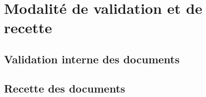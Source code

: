 \section{Modalité de validation et de recette}

\subsection{Validation interne des documents}

\subsection{Recette des documents}


